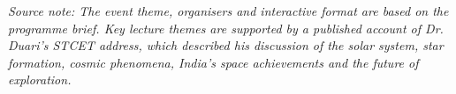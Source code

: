 \vfill
\noindent
{\footnotesize\sloppy\textit{Source note: The event theme, organisers and interactive format are based on the programme brief. Key lecture themes are supported by a published account of Dr. Duari's STCET address, which described his discussion of the solar system, star formation, cosmic phenomena, India's space achievements and the future of exploration.}\par}